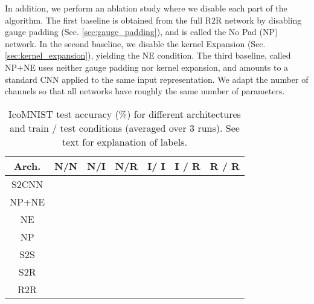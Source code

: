 \documentclass{article}
\begin{document}
In addition, we perform an ablation study where we disable each part of the algorithm.
The first baseline is obtained from the full R2R network by disabling gauge padding (Sec. \ref{sec:gauge_padding}), and is called the No Pad (NP) network.
In the second baseline, we disable the kernel Expansion (Sec. \ref{sec:kernel_expansion}), yielding the NE condition.
The third baseline, called NP+NE uses neither gauge padding nor kernel expansion, and amounts to a standard CNN applied to the same input representation.
We adapt the number of channels so that all networks have roughly the same number of parameters.

\begin{table}[b]
\small
\centering
\begin{tabular}{c | c c c c c c}
    Arch.  & N/N            & N/I & N/R             & I/ I & I / R & R / R \\
    \hline
    S2CNN & {\tiny } & {\tiny } & {\tiny } & {\tiny } & {\tiny } & {\tiny } \\
    \hline
    NP+NE & {\tiny }  & {\tiny } & {\tiny } & {\tiny } & {\tiny } & {\tiny } \\
    NE    & {\tiny } & {\tiny } & {\tiny } & {\tiny }            & {\tiny }   & {\tiny } \\
    NP    & {\tiny } & {\tiny } & {\tiny } & {\tiny } & {\tiny } & {\tiny } \\
    S2S   & {\tiny } & {\tiny } & {\tiny } & {\tiny }            & {\tiny }   & {\tiny } \\
    S2R   & {\tiny } & {\tiny } & {\tiny } & {\tiny }            & {\tiny }   & {\tiny } \\
    R2R   & {\tiny } & {\tiny } & {\tiny } & {\tiny }            & {\tiny } & {\tiny } \\
\end{tabular}
\caption{IcoMNIST test accuracy (\%) for different architectures and train / test conditions (averaged over 3 runs). See text for explanation of labels.}
\label{tab:mnist}
\end{table}
\end{document}
